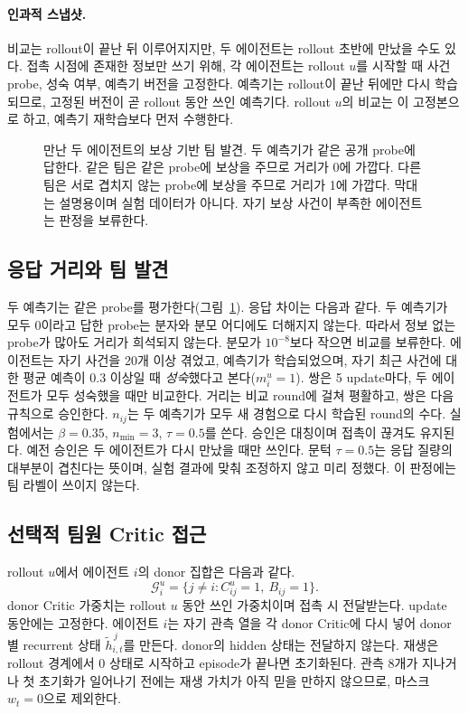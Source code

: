 \documentclass[10pt,twocolumn,letterpaper]{article}
\begin{document}
\paragraph{인과적 스냅샷.}
비교는 rollout이 끝난 뒤 이루어지지만, 두 에이전트는 rollout 초반에 만났을 수도 있다. 접촉 시점에 존재한 정보만 쓰기 위해, 각 에이전트는 rollout $u$를 시작할 때 사건 probe, 성숙 여부, 예측기 버전을 고정한다. 예측기는 rollout이 끝난 뒤에만 다시 학습되므로, 고정된 버전이 곧 rollout 동안 쓰인 예측기다. rollout $u$의 비교는 이 고정본으로 하고, 예측기 재학습보다 먼저 수행한다.

\begin{figure}[t]
\centering\resizebox{.97\textwidth}{!}{}
\caption{만난 두 에이전트의 보상 기반 팀 발견. 두 예측기가 같은 공개 probe에 답한다. 같은 팀은 같은 probe에 보상을 주므로 거리가 0에 가깝다. 다른 팀은 서로 겹치지 않는 probe에 보상을 주므로 거리가 1에 가깝다. 막대는 설명용이며 실험 데이터가 아니다. 자기 보상 사건이 부족한 에이전트는 판정을 보류한다.}\label{fig:discovery}
\end{figure}

\subsection{응답 거리와 팀 발견}
두 예측기는 같은 probe를 평가한다(그림~\ref{fig:discovery}). 응답 차이는 다음과 같다.
\DistanceEquation
두 예측기가 모두 0이라고 답한 probe는 분자와 분모 어디에도 더해지지 않는다. 따라서 정보 없는 probe가 많아도 거리가 희석되지 않는다. 분모가 $10^{-8}$보다 작으면 비교를 보류한다. 에이전트는 자기 사건을 20개 이상 겪었고, 예측기가 학습되었으며, 자기 최근 사건에 대한 평균 예측이 0.3 이상일 때 \emph{성숙}했다고 본다($m_i^u=1$). 쌍은 5 update마다, 두 에이전트가 모두 성숙했을 때만 비교한다. 거리는 비교 round에 걸쳐 평활하고, 쌍은 다음 규칙으로 승인한다.
\ApprovalEquation
$n_{ij}$는 두 예측기가 모두 새 경험으로 다시 학습된 round의 수다. 실험에서는 $\beta=0.35$, $n_{\min}=3$, $\tau=0.5$를 쓴다. 승인은 대칭이며 접촉이 끊겨도 유지된다. 예전 승인은 두 에이전트가 다시 만났을 때만 쓰인다. 문턱 $\tau=0.5$는 응답 질량의 대부분이 겹친다는 뜻이며, 실험 결과에 맞춰 조정하지 않고 미리 정했다. 이 판정에는 팀 라벨이 쓰이지 않는다.

\subsection{선택적 팀원 Critic 접근}
rollout $u$에서 에이전트 $i$의 donor 집합은 다음과 같다.
\begin{equation}\label{eq:donorset}
\mathcal G_i^u=\{j\ne i: C_{ij}^u=1,\ B_{ij}=1\}.
\end{equation}
donor Critic 가중치는 rollout $u$ 동안 쓰인 가중치이며 접촉 시 전달받는다. update 동안에는 고정한다. 에이전트 $i$는 자기 관측 열을 각 donor Critic에 다시 넣어 donor별 recurrent 상태 $\tilde h^{\,j}_{i,t}$를 만든다. donor의 hidden 상태는 전달하지 않는다. 재생은 rollout 경계에서 0 상태로 시작하고 episode가 끝나면 초기화된다. 관측 8개가 지나거나 첫 초기화가 일어나기 전에는 재생 가치가 아직 믿을 만하지 않으므로, 마스크 $w_t=0$으로 제외한다.
\end{document}
